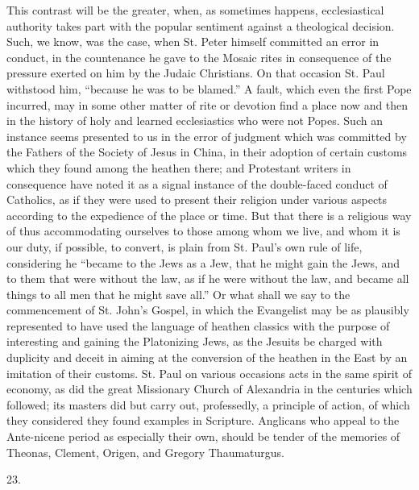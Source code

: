This contrast will be the greater, when, as sometimes happens,
ecclesiastical authority takes part with the popular sentiment against
a theological decision. Such, we know, was the case, when St. Peter
himself committed an error in conduct, in the countenance he
gave to the Mosaic rites in consequence of the pressure exerted on him
by the Judaic Christians. On that occasion St. Paul withstood him,
``because he was to be blamed.'' A fault, which even the first
Pope incurred, may in some other matter of rite or devotion find a
place now and then in the history of holy and learned ecclesiastics
who were not Popes. Such an instance seems presented to us in the
error of judgment which was committed by the Fathers of the Society of
Jesus in China, in their adoption of certain customs which they found
among the heathen there; and Protestant writers in consequence have
noted it as a signal instance of the double-faced conduct of
Catholics, as if they were used to present their religion under
various aspects according to the expedience of the place or time. But
that there is a religious way of thus accommodating ourselves to those
among whom we live, and whom it is our duty, if possible, to convert,
is plain from St. Paul's own rule of life, considering he ``became
to the Jews as a Jew, that he might gain the Jews, and to them that
were without the law, as if he were without the law, and became all
things to all men that he might save all.'' Or what shall we say
to the commencement of St. John's Gospel, in which the Evangelist may
be as plausibly represented to have used the language of heathen
classics with the purpose of interesting and gaining the
Platonizing Jews, as the Jesuits be charged with duplicity and deceit
in aiming at the conversion of the heathen in the East by an imitation
of their customs. St. Paul on various occasions acts in the same
spirit of economy, as did the great Missionary Church of Alexandria in
the centuries which followed; its masters did but carry out,
professedly, a principle of action, of which they considered they
found examples in Scripture. Anglicans who appeal to the Ante-nicene
period as especially their own, should be tender of the memories of
Theonas, Clement, Origen, and Gregory Thaumaturgus.

23.

